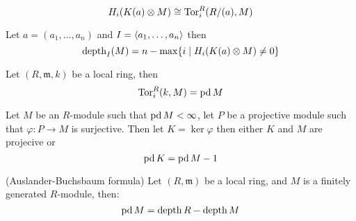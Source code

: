 \begin{lemma}
	\label{thm:KoszulComplex_res_quotient_ring}
\end{lemma}

\begin{lemma}
	\label{lem:tor_measures_koszul_homology}
	$$H_i(K(a) \otimes M) \cong \operatorname{Tor}_i^R (R/(a), M)$$
\end{lemma}

\begin{lemma}
	\label{lem:koszul_homology_mesures_depth}
	Let $a = (a_1, \dots, a_n)$ and $I = \langle a_1, \dots, a_n\rangle$ then
	$$\operatorname{depth}_I(M) = n - \max\{i \mid H_i(K(a) \otimes M) \neq 0\}$$
\end{lemma}

\begin{lemma}
	\label{lem:tor_eq_pd_if_local}
	Let $(R, \mathfrak{m}, k)$ be a local ring, then
	$$\operatorname{Tor}_i^R(k, M) = \operatorname{pd} M$$
\end{lemma}

\begin{proposition}
	\label{prop:globdim_eq_projdim_of_residue}
\end{proposition}

\begin{lemma}
	\label{lem:projdim_ker_eq_one_less}
	Let $M$ be an $R$-module such that $\operatorname{pd} M < \infty$, let $P$ be a projective module such that $\varphi: P \to M$ is surjective.
	Then let $K = \ker \varphi$ then either $K$ and $M$ are projecive or
	$$\operatorname{pd} K = \operatorname{pd} M - 1$$
\end{lemma}

\begin{lemma}
	\label{lem:koszul_homotopy}
\end{lemma}

\begin{proposition}
	\label{prop:koszul_homology_annil_by_maximal}
\end{proposition}

\begin{theorem} (Auslander-Buchsbaum formula) Let $(R, \mathfrak{m})$ be a local ring, and $M$ is a finitely generated $R$-module, then:
	\label{thm:auslander_buchsbaum_formula}
	$$\operatorname{pd} M = \operatorname{depth} R - \operatorname{depth} M$$
\end{theorem}


